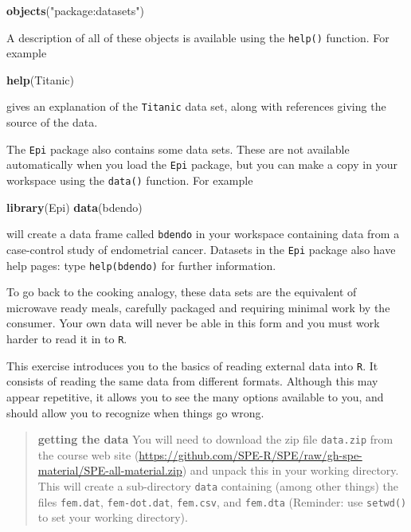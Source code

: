 \documentclass[
]{book}
\newenvironment{Shaded}{\begin{snugshade}}{\end{snugshade}}
\newcommand{\FunctionTok}[1]{\textcolor[rgb]{0.13,0.29,0.53}{\textbf{#1}}}
\newcommand{\NormalTok}[1]{#1}
\newcommand{\StringTok}[1]{\textcolor[rgb]{0.31,0.60,0.02}{#1}}
\begin{document}
\begin{Shaded}
\begin{Highlighting}[]
\FunctionTok{objects}\NormalTok{(}\StringTok{"package:datasets"}\NormalTok{)}
\end{Highlighting}
\end{Shaded}

A description of all of these objects is available using the \texttt{help()}
function. For example

\begin{Shaded}
\begin{Highlighting}[]
\FunctionTok{help}\NormalTok{(Titanic)}
\end{Highlighting}
\end{Shaded}

gives an explanation of the \texttt{Titanic} data set, along with
references giving the source of the data.

The \texttt{Epi} package also contains some data sets. These are not
available automatically when you load the \texttt{Epi} package, but
you can make a copy in your workspace using the \texttt{data()}
function. For example

\begin{Shaded}
\begin{Highlighting}[]
\FunctionTok{library}\NormalTok{(Epi)}
\FunctionTok{data}\NormalTok{(bdendo)}
\end{Highlighting}
\end{Shaded}

will create a data frame called \texttt{bdendo} in your workspace
containing data from a case-control study of endometrial cancer.
Datasets in the \texttt{Epi} package also have help pages: type
\texttt{help(bdendo)} for further information.

To go back to the cooking analogy, these data sets are the equivalent
of microwave ready meals, carefully packaged and requiring minimal
work by the consumer. Your own data will never be able in this form
and you must work harder to read it in to \texttt{R}.

This exercise introduces you to the basics of reading external data
into \texttt{R}. It consists of reading the same data from different
formats. Although this may appear repetitive, it allows you to see
the many options available to you, and should allow you to recognize
when things go wrong.

\begin{quote}
\textbf{getting the data} You will need to download the zip file \texttt{data.zip} from the course web site (\url{https://github.com/SPE-R/SPE/raw/gh-spe-material/SPE-all-material.zip}) and unpack this in your working directory. This will create a sub-directory \texttt{data} containing (among other things) the files \texttt{fem.dat}, \texttt{fem-dot.dat}, \texttt{fem.csv}, and \texttt{fem.dta} (Reminder: use \texttt{setwd()} to set
your working directory).
\end{quote}
\end{document}
